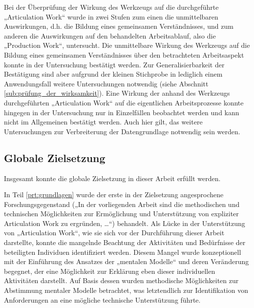 Bei der Überprüfung der Wirkung des Werkzeugs auf die durchgeführte „Articulation Work“ wurde in zwei Stufen zum einen die unmittelbaren Auswirkungen, d.h. die Bildung eines gemeinsamen Verständnisses, und zum anderen die Auswirkungen auf den behandelten Arbeitsablauf, also die „Production Work“, untersucht. Die unmittelbare Wirkung des Werkzeugs auf die Bildung eines gemeinsamen Verständnisses über den betrachteten Arbeitsaspekt konnte in der Untersuchung bestätigt werden. Zur Generalisierbarkeit der Bestätigung sind aber aufgrund der kleinen Stichprobe in lediglich einem Anwendungsfall weitere Untersuchungen notwendig (siehe Abschnitt \ref{sub:prüfung_der_wirksamkeit}). Eine Wirkung der anhand des Werkzeugs durchgeführten „Articulation Work“ auf die eigentlichen Arbeitsprozesse konnte hingegen in der Untersuchung nur in Einzelfällen beobachtet werden und kann nicht im Allgemeinen bestätigt werden. Auch hier gilt, das weitere Untersuchungen zur Verbreiterung der Datengrundlage notwendig sein werden.

\subsection{Globale Zielsetzung} %
\label{sub:globale_zielsetzung}

Insgesamt konnte die globale Zielsetzung in dieser Arbeit erfüllt werden. 

In Teil \ref{prt:grundlagen} wurde der erste in der Zielsetzung angesprochene Forschungsgegenstand („In der vorliegenden Arbeit sind die methodischen und technischen Möglichkeiten zur Ermöglichung und Unterstützung von expliziter Articulation Work zu ergründen, \ldots“) behandelt. Als Lücke in der Unterstützung von „Articulation Work“, wie sie sich vor der Durchführung dieser Arbeit darstellte, konnte die mangelnde Beachtung der Aktivitäten und Bedürfnisse der beteiligten Individuen identifiziert werden. Diesem Mangel wurde konzeptionell mit der Einführung des Ansatzes der „mentalen Modelle“ und deren Veränderung begegnet, der eine Möglichkeit zur Erklärung eben dieser individuellen Aktivitäten darstellt. Auf Basis dessen wurden methodische Möglichkeiten zur Abstimmung mentaler Modelle betrachtet, was letztendlich zur Identifikation von Anforderungen an eine mögliche technische Unterstützung führte.

